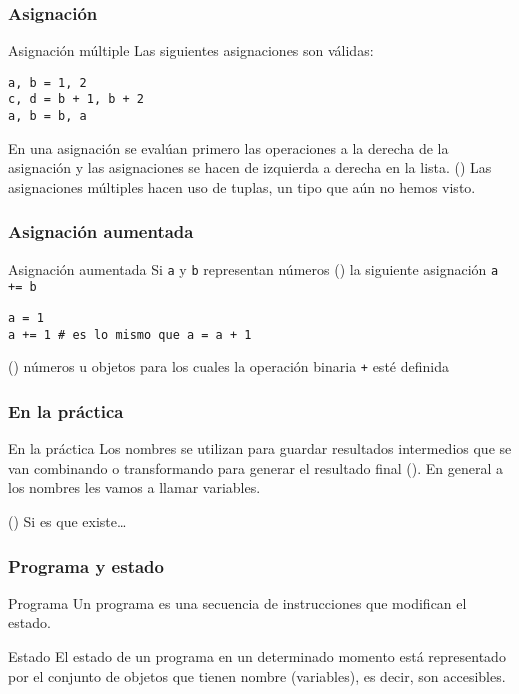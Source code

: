 \documentclass{beamer}
\begin{document}
\begin{frame}[fragile]
\frametitle{Asignación}
\begin{block}{Asignación múltiple}
Las siguientes asignaciones son válidas:
\begin{verbatim}
a, b = 1, 2
c, d = b + 1, b + 2
a, b = b, a
\end{verbatim}
En una asignación se evalúan primero las operaciones a la derecha de la asignación y las asignaciones se hacen de izquierda a derecha en la lista.
(\dag) Las asignaciones múltiples hacen uso de \alert{tuplas}, un tipo que aún no hemos visto.
\end{block}
\end{frame}

\begin{frame}[fragile]
\frametitle{Asignación aumentada} 
\begin{block}{Asignación aumentada}
Si \texttt{a} y \texttt{b} representan números (\dag) la siguiente asignación \texttt{a += b} 
\begin{verbatim}
a = 1
a += 1 # es lo mismo que a = a + 1
\end{verbatim}
\end{block}
(\dag) números u objetos para los cuales la operación binaria \texttt{+} esté definida
\end{frame}

\begin{frame}[fragile]
\frametitle{En la práctica} 
\begin{block}{En la práctica}
Los nombres se utilizan para guardar resultados intermedios que se van combinando o transformando para generar el resultado final (\dag).
En general a los nombres les vamos a llamar \alert{variables}.
\end{block}
(\dag) Si es que existe\ldots
\end{frame}

\begin{frame}[fragile]
\frametitle{Programa y estado} 
\begin{block}{Programa}
Un programa es una secuencia de instrucciones que modifican el \alert{estado}.
\end{block}
\begin{block}{Estado}
El estado de un programa en un determinado momento está representado por el conjunto de objetos que tienen nombre (variables), es decir, son accesibles.
\end{block}
\end{frame}
\end{document}

